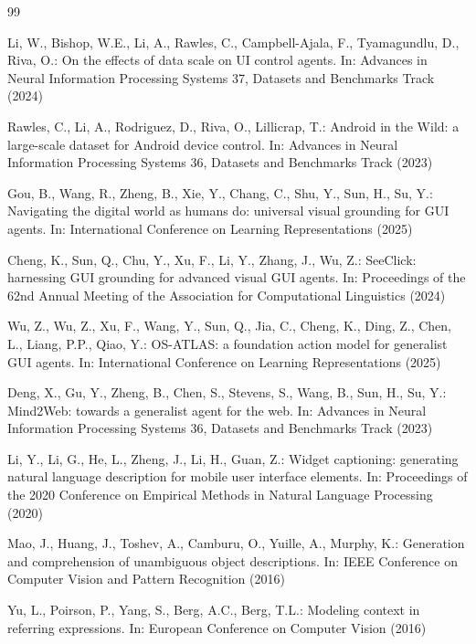 \documentclass[runningheads,a4paper]{llncs}
\begin{document}
\begin{thebibliography}{99}

Li, W., Bishop, W.E., Li, A., Rawles, C., Campbell-Ajala, F., Tyamagundlu, D., Riva, O.:
On the effects of data scale on UI control agents. In: Advances in Neural Information Processing
Systems 37, Datasets and Benchmarks Track (2024)

Rawles, C., Li, A., Rodriguez, D., Riva, O., Lillicrap, T.: Android in the Wild: a large-scale
dataset for Android device control. In: Advances in Neural Information Processing Systems 36,
Datasets and Benchmarks Track (2023)

Gou, B., Wang, R., Zheng, B., Xie, Y., Chang, C., Shu, Y., Sun, H., Su, Y.: Navigating the
digital world as humans do: universal visual grounding for GUI agents. In: International
Conference on Learning Representations (2025)

Cheng, K., Sun, Q., Chu, Y., Xu, F., Li, Y., Zhang, J., Wu, Z.: SeeClick: harnessing GUI
grounding for advanced visual GUI agents. In: Proceedings of the 62nd Annual Meeting of the
Association for Computational Linguistics (2024)

Wu, Z., Wu, Z., Xu, F., Wang, Y., Sun, Q., Jia, C., Cheng, K., Ding, Z., Chen, L.,
Liang, P.P., Qiao, Y.: OS-ATLAS: a foundation action model for generalist GUI agents. In:
International Conference on Learning Representations (2025)

Deng, X., Gu, Y., Zheng, B., Chen, S., Stevens, S., Wang, B., Sun, H., Su, Y.: Mind2Web: towards
a generalist agent for the web. In: Advances in Neural Information Processing Systems 36,
Datasets and Benchmarks Track (2023)

Li, Y., Li, G., He, L., Zheng, J., Li, H., Guan, Z.: Widget captioning: generating natural
language description for mobile user interface elements. In: Proceedings of the 2020 Conference
on Empirical Methods in Natural Language Processing (2020)

Mao, J., Huang, J., Toshev, A., Camburu, O., Yuille, A., Murphy, K.: Generation and comprehension
of unambiguous object descriptions. In: IEEE Conference on Computer Vision and Pattern
Recognition (2016)

Yu, L., Poirson, P., Yang, S., Berg, A.C., Berg, T.L.: Modeling context in referring expressions.
In: European Conference on Computer Vision (2016)


\end{thebibliography}
\end{document}

